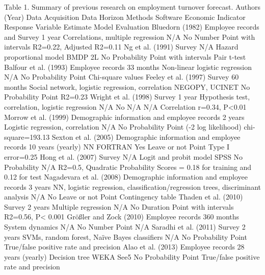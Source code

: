 Table 1. Summary of previous research on employment turnover forecast.
Authors (Year)	Data Acquisition	 Data Horizon	Methods	Software	Economic Indicator	Response Variable	Estimate	Model Evaluation
Bluedorn (1982)
Employee records and Survey	1 year	Correlations, multiple regression	N/A	No	Number	Point with intervals	R2=0.22, 
Adjusted R2=0.11
Ng et al. (1991)
Survey	N/A	Hazard proportional model	BMDP 2L	No	 Probability 	Point with intervals	Pair t-test 
Balfour et al. (1993)
Employee records 	33 months	Non-linear logistic regression	N/A	No	Probability 	Point	Chi-square values 
Feeley et al. (1997)
Survey	60 months	Social network, logistic regression, correlation	NEGOPY, UCINET	No	Probability 	Point	R2=0.23
Wright et al. (1998)
Survey	1 year	Hypothesis test, correlation, logistic regression 	N/A	No	N/A	N/A	Correlation r=0.34, P<0.01
Morrow et al. (1999)
Demographic information and employee records	2 years	Logistic regression, correlation	N/A	No	Probability 	Point	(-2 log likelihood) chi-square=193.13
Sexton et al. (2005)
Demographic information and employee records	10 years (yearly)	NN	FORTRAN 	Yes	Leave or not	Point	Type I error=0.25%
Hong et al. (2007)
Survey	N/A	Logit and probit model	SPSS	No	Probability 	N/A	R2=0.5, Quadratic Probability Scores = 0.18 for training and 0.12 for test
Nagadevara et al. (2008)
Demographic information and employee records	3 years	NN, logistic regression, classification/regression trees, discriminant analysis	N/A	No	Leave or not	Point	Contingency table
Thaden et al. (2010)
Survey	2 years	Multiple regression	N/A	No	Duration	Point with intervals	 R2=0.56, P< 0.001
Größler and Zock (2010)
Employee records	360 months	System dynamics 	N/A	No	Number	Point	N/A
Saradhi et al. (2011)
Survey	2 years	SVMs, random forest,  Naïve Bayes classifiers	N/A	No	Probability 	Point	True/false positive rate and precision
Alao et al. (2013)
Employee records  	28 years (yearly)	Decision tree	WEKA See5	No	Probability 	Point	True/false positive rate and precision

